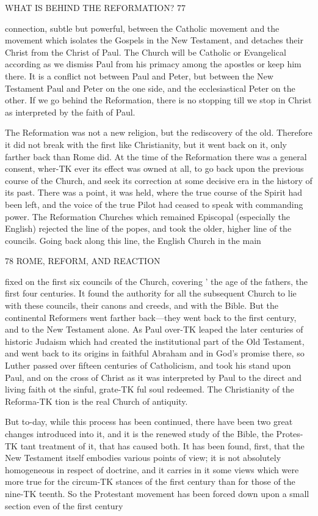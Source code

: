 \documentclass[12pt,a5paper,twoside]{book}
\begin{document}
WHAT IS BEHIND THE REFORMATION? 77 

connection, subtle but powerful, between the Catholic 
movement and the movement which isolates the 
Gospels in the New Testament, and detaches their 
Christ from the Christ of Paul. The Church will 
be Catholic or Evangelical according as we dismiss 
Paul from his primacy among the apostles or keep 
him there. It is a conflict not between Paul and 
Peter, but between the New Testament Paul and 
Peter on the one side, and the ecclesiastical Peter on 
the other. If we go behind the Reformation, there 
is no stopping till we stop in Christ as interpreted by 
the faith of Paul. 

The Reformation was not a new religion, but the 
rediscovery of the old. Therefore it did not break 
with the first like Christianity, but it went back on it, 
only farther back than Rome did. At the time of 
the Reformation there was a general consent, wher-TK
ever its effect was owned at all, to go back upon the 
previous course of the Church, and seek its correction 
at some decisive era in the history of its past. There 
was a point, it was held, where the true course of the 
Spirit had been left, and the voice of the true Pilot 
had ceased to speak with commanding power. The 
Reformation Churches which remained Episcopal 
(especially the English) rejected the line of the popes, 
and took the older, higher line of the councils. Going 
back along this line, the English Church in the main 



78 ROME, REFORM, AND REACTION 

fixed on the first six councils of the Church, covering ' 
the age of the fathers, the first four centuries. It 
found the authority for all the subsequent Church to 
lie with these councils, their canons and creeds, and 
with the Bible. But the continental Reformers went 
farther back---they went back to the first century, 
and to the New Testament alone. As Paul over-TK
leaped the later centuries of historic Judaism which had 
created the institutional part of the Old Testament, 
and went back to its origins in faithful Abraham and 
in God's promise there, so Luther passed over fifteen 
centuries of Catholicism, and took his stand upon Paul, 
and on the cross of Christ as it was interpreted by 
Paul to the direct and living faith ot the sinful, grate-TK
ful soul redeemed. The Christianity of the Reforma-TK
tion is the real Church of antiquity. 

But to-day, while this process has been continued, 
there have been two great changes introduced into it, 
and it is the renewed study of the Bible, the Protes-TK
tant treatment of it, that has caused both. It has 
been found, first, that the New Testament itself 
embodies various points of view; it is not absolutely 
homogeneous in respect of doctrine, and it carries in 
it some views which were more true for the circum-TK
stances of the first century than for those of the nine-TK
teenth. So the Protestant movement has been forced 
down upon a small section even of the first century 
\end{document}
